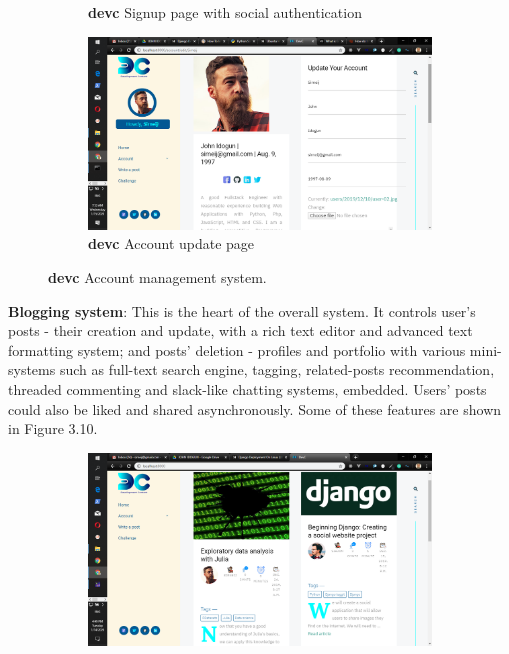 \begin{itemize}
\begin{figure}[!htbp]
\begin{subfigure}[b]{0.45\textwidth}
			\caption{\textbf{devc} Signup page with social authentication}
		\end{subfigure}
		\medskip
		\begin{subfigure}[b]{0.5\textwidth}
			\centering
			\includegraphics[width=\linewidth]{./devcaccount}
			\caption{\textbf{devc} Account update page}
		\end{subfigure}
		\caption{\textbf{devc} Account management system.}
	\end{figure}
	\subitem \textbf{Blogging system}: This is the heart of the overall system. It controls user's posts - their creation and  update, with a rich text editor and advanced text formatting system; and posts' deletion - profiles and portfolio with various mini-systems such as full-text search engine, tagging, related-posts recommendation, threaded commenting and slack-like chatting systems, embedded. Users' posts could also be liked and shared asynchronously. Some of these features are shown in Figure 3.10.
	\begin{figure}[!htbp]
		\centering
		\begin{subfigure}[b]{0.45\textwidth}
			\centering
			\includegraphics[width=\linewidth]{./devcmainwithout}

\end{subfigure}
\end{figure}
\end{itemize}
